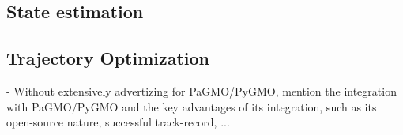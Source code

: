 \documentclass[]{IAC_style}
\begin{document}
    \subsection{State estimation}

    \subsection{Trajectory Optimization}
    
    - Without extensively advertizing for PaGMO/PyGMO, mention the integration with PaGMO/PyGMO and the key advantages of its integration, such as its open-source nature, successful track-record, ...
\end{document}
